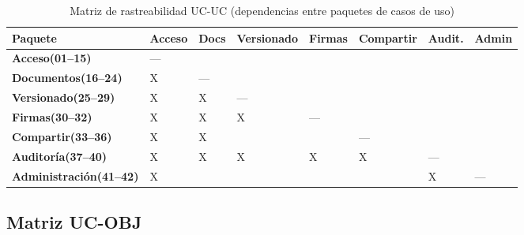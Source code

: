 \documentclass[11pt, a4paper]{article}
\begin{document}
{{\setlength{\tabcolsep}{3pt}
\begin{table}[htbp]
\centering
\footnotesize
\begin{tabular}{|p{3.0cm}|p{1.1cm}|p{1.1cm}|p{1.3cm}|p{1.1cm}|p{1.2cm}|p{1.1cm}|p{1.1cm}|}
\hline
\textbf{Paquete} & \textbf{Acceso} & \textbf{Docs} & \textbf{Versio\-nado} & \textbf{Firmas} & \textbf{Compar\-tir} & \textbf{Audit.} & \textbf{Admin} \\
\hline
\hline
\textbf{Acceso\newline(01--15)} & --- & & & & & & \\
\hline
\textbf{Documentos\newline(16--24)} & X & --- & & & & & \\
\hline
\textbf{Versionado\newline(25--29)} & X & X & --- & & & & \\
\hline
\textbf{Firmas\newline(30--32)} & X & X & X & --- & & & \\
\hline
\textbf{Compartir\newline(33--36)} & X & X & & & --- & & \\
\hline
\textbf{Auditoría\newline(37--40)} & X & X & X & X & X & --- & \\
\hline
\textbf{Administración\newline(41--42)} & X & & & & & X & --- \\
\hline
\end{tabular}
\caption{Matriz de rastreabilidad UC-UC (dependencias entre paquetes de casos de uso)}
\label{tab:matriz-uc-uc}
\end{table}}

\subsection{Matriz UC-OBJ}

}
\end{document}
